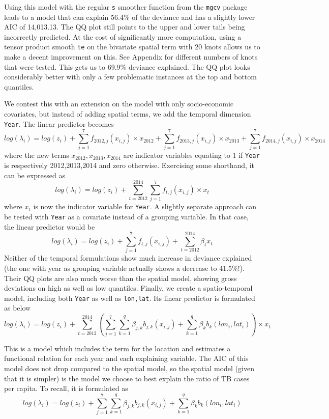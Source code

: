 Using this model with the regular \texttt{s} smoother function from the \texttt{mgcv} package leads to a model that can explain 56.4\% of the deviance and has a slightly lower AIC of 14,013.13. The QQ plot still points to the upper and lower tails being incorrectly predicted. At the cost of significantly more computation, using a tensor product smooth \texttt{te} on the bivariate spatial term with 20 knots allows us to make a decent improvement on this. See Appendix for different numbers of knots that were tested. This gets us to 69.9\% deviance explained. The QQ plot looks considerably better with only a few problematic instances at the top and bottom quantiles.

We contest this with an extension on the model with only socio-economic covariates, but instead of adding spatial terms, we add the temporal dimension \texttt{Year}. The linear predictor becomes
$$
log(\lambda_i) = log(z_i) +  \sum_{j=1}^{7}f_{2012, j}(x_{i,j})\times x_{2012}  + \sum_{j=1}^{7}f_{2013, j}(x_{i,j})\times x_{2013} +  \sum_{j=1}^{7}f_{2014, j}(x_{i,j})\times x_{2014}
$$
where the new terms $x_{2012},x_{2013},x_{2014}$ are indicator variables equating to 1 if \texttt{Year} is respectively 2012,2013,2014 and zero otherwise. Exercising some shorthand, it can be expressed as
$$
log(\lambda_i) = log(z_i) +  \sum_{t=2012}^{2014}\sum_{j=1}^{7}f_{t, j}(x_{i,j})\times x_{t}
$$
where $x_t$ is now the indicator variable for \texttt{Year}. A slightly separate approach can be tested with \texttt{Year} as a covariate instead of a grouping variable. In that case, the linear predictor would be
$$
log(\lambda_i) = log(z_i) +  \sum_{j=1}^{7}f_{t, j}(x_{i,j}) + \sum_{t=2012}^{2014}\beta_t x_t
$$
Neither of the temporal formulations show much increase in deviance explained (the one with year as grouping variable actually shows a decrease to 41.5\%!). Their QQ plots are also much worse than the spatial model, showing gross deviations on high as well as low quantiles. Finally, we create a spatio-temporal model, including both \texttt{Year} as well as \texttt{lon,lat}. Its linear predictor is formulated as below
$$
log(\lambda_i) = log(z_i) +  \sum_{t=2012}^{2014}\left( \sum_{j=1}^{7}\sum_{k=1}^{q}\beta_{j,k}b_{j,k}(x_{i,j}) + \sum_{k=1}^{q}\beta_{k}b_{k}(lon_i , lat_i) \right) \times x_{t}
$$
\newline

This is a model which includes the term for the location and estimates a functional relation for
each year and each explaining variable. The AIC of this model does not drop compared to the spatial model,
so the spatial model (given that it is simpler) is the model we choose to best explain the ratio of TB cases per capita. To recall, it is formulated as 
$$
log(\lambda_i) = log(z_i) +  \sum_{j=1}^{7}\sum_{k=1}^{q}\beta_{j,k}b_{j,k}(x_{i,j}) + \sum_{k=1}^{q}\beta_{k}b_{k}(lon_i , lat_i) 
$$
\newline


